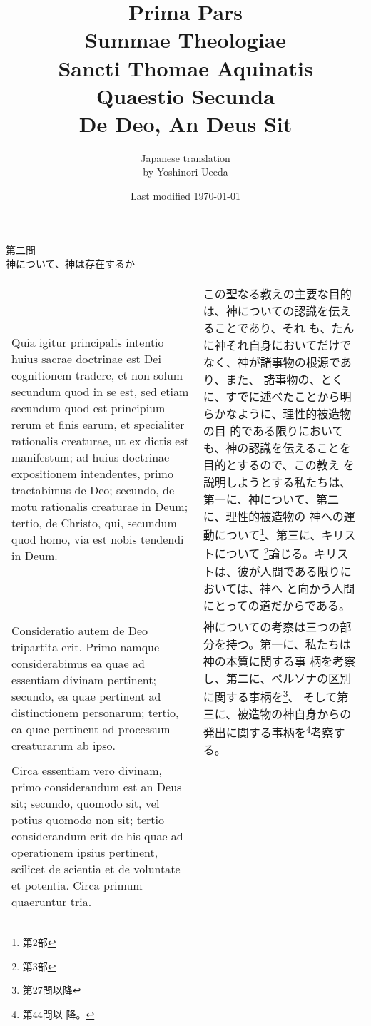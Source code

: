 \documentclass[10pt]{jsarticle}
\title{{\bf Prima Pars}\\{\HUGE Summae Theologiae}\\Sancti Thomae
Aquinatis\\Quaestio Secunda\\{\bf De Deo, An Deus Sit}}
\author{Japanese translation\\by Yoshinori {\sc Ueeda}}
\date{Last modified \today}
\begin{document}
\maketitle
\begin{center}
 {\Large 第二問\\神について、神は存在するか}
\end{center}

\begin{longtable}{p{21em}p{21em}}
Quia igitur principalis intentio huius sacrae doctrinae est Dei
cognitionem tradere, et non solum secundum quod in se est, sed etiam
secundum quod est principium rerum et finis earum, et specialiter
rationalis creaturae, ut ex dictis est manifestum; ad huius doctrinae
expositionem intendentes, primo tractabimus de Deo; secundo, de motu
rationalis creaturae in Deum; tertio, de Christo, qui, secundum quod
homo, via est nobis tendendi in Deum.

&

この聖なる教えの主要な目的は、神についての認識を伝えることであり、それ
も、たんに神それ自身においてだけでなく、神が諸事物の根源であり、また、
諸事物の、とくに、すでに述べたことから明らかなように、理性的被造物の目
的である限りにおいても、神の認識を伝えることを目的とするので、この教え
を説明しようとする私たちは、第一に、神について、第二に、理性的被造物の
神への運動について\footnote{第2部}、第三に、キリストについて
\footnote{第3部}論じる。キリストは、彼が人間である限りにおいては、神へ
と向かう人間にとっての道だからである。

\\

Consideratio autem de Deo tripartita erit. Primo namque considerabimus
ea quae ad essentiam divinam pertinent; secundo, ea quae pertinent ad
distinctionem personarum; tertio, ea quae pertinent ad processum
creaturarum ab ipso.

&

神についての考察は三つの部分を持つ。第一に、私たちは神の本質に関する事
柄を考察し、第二に、ペルソナの区別に関する事柄を\footnote{第27問以降}、
そして第三に、被造物の神自身からの発出に関する事柄を\footnote{第44問以
降。}考察する。

\\

Circa essentiam vero divinam, primo considerandum est an Deus sit;
secundo, quomodo sit, vel potius quomodo non sit; tertio considerandum
erit de his quae ad operationem ipsius pertinent, scilicet de scientia
et de voluntate et potentia. Circa primum quaeruntur tria.


\end{longtable}
\end{document}
